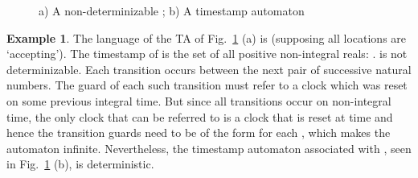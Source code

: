 \documentclass[11pt]{amsart}
\theoremstyle{definition}
\newtheorem{example}[theorem]{Example}
\begin{document}
\begin{figure}[htb]
\centering
{}
\caption{a) A non-determinizable  ; b) A timestamp automaton }
\label{fig:time_stamp1}
\end{figure} 
\begin{example}
The language of the TA  of Fig.~\ref{fig:time_stamp1} (a) is
 (supposing all locations are `accepting').
The timestamp of  is the set of all positive non-integral reals: .
 is not determinizable. Each transition occurs between the next pair of successive natural numbers.
The guard of each such transition must refer to a clock which was reset on some previous integral time.
But since all transitions occur on non-integral time, the only clock that can be referred to is a clock  that is reset at time  and hence the transition guards need to be of the form  for each , which makes the automaton infinite.
Nevertheless, the timestamp automaton associated with , seen in Fig.~\ref{fig:time_stamp1} (b), is deterministic.
\end{example}
\end{document}
